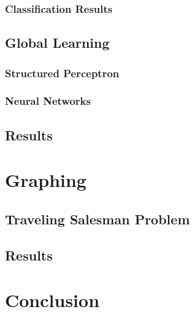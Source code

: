 \documentclass[12pt]{report}
\begin{document}
\subsection{Classification Results}

\section{Global Learning}
\subsection{Structured Perceptron}
\subsection{Neural Networks}

\section{Results}

\chapter{Graphing}
\section{Traveling Salesman Problem}

\section{Results}

\chapter{Conclusion}




\end{document}
